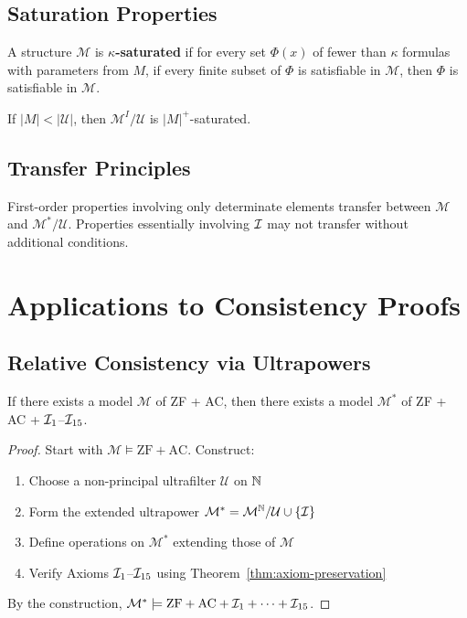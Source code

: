 \subsection{Saturation Properties}

\begin{definition}
A structure $\mathcal{M}$ is \textbf{$\kappa$-saturated} if for every set $\Phi(x)$ of fewer than $\kappa$ formulas with parameters from $M$, if every finite subset of $\Phi$ is satisfiable in $\mathcal{M}$, then $\Phi$ is satisfiable in $\mathcal{M}$.
\end{definition}

\begin{theorem}
If $|M| < |\mathcal{U}|$, then $\mathcal{M}^I/\mathcal{U}$ is $|M|^+$-saturated.
\end{theorem}

\subsection{Transfer Principles}

\begin{theorem}
First-order properties involving only determinate elements transfer between $\mathcal{M}$ and $\mathcal{M}^*/\mathcal{U}$. Properties essentially involving $\mathcal{I}$ may not transfer without additional conditions.
\end{theorem}

\section{Applications to Consistency Proofs}

\subsection{Relative Consistency via Ultrapowers}

\begin{theorem}
\label{thm:ultrapower-consistency}
If there exists a model $\mathcal{M}$ of ZF + AC, then there exists a model $\mathcal{M}^*$ of ZF + AC + $\mathcal{I}_1$--$\mathcal{I}_{15}$.
\end{theorem}

\begin{proof}
Start with $\mathcal{M} \models \text{ZF} + \text{AC}$. Construct:
\begin{enumerate}
    \item Choose a non-principal ultrafilter $\mathcal{U}$ on $\mathbb{N}$
    \item Form the extended ultrapower $\mathcal{M}^* = \mathcal{M}^{\mathbb{N}}/\mathcal{U} \cup \{\mathcal{I}\}$
    \item Define operations on $\mathcal{M}^*$ extending those of $\mathcal{M}$
    \item Verify Axioms $\mathcal{I}_1$--$\mathcal{I}_{15}$ using Theorem~\ref{thm:axiom-preservation}
\end{enumerate}

By the construction, $\mathcal{M}^* \models \text{ZF} + \text{AC} + \mathcal{I}_1 + \cdots + \mathcal{I}_{15}$.
\end{proof}

